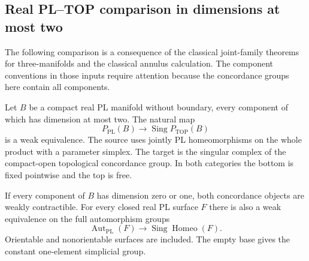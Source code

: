 \subsection{Real PL--TOP comparison in dimensions at most two}

The following comparison is a consequence of the classical joint-family
theorems for three-manifolds and the classical annulus calculation.
The component conventions in those inputs require attention because
the concordance groups here contain all components.

\begin{theorem}\label{thm:low-dimensional-real-concordance-comparison}
Let $B$ be a compact real PL manifold without boundary, every component
of which has dimension at most two.  The natural map
\[
 P_{\mathrm{PL}}(B)\longrightarrow
 \operatorname{Sing}P_{\mathrm{TOP}}(B)
\]
is a weak equivalence.  The source uses jointly PL homeomorphisms on
the whole product with a parameter simplex.  The target is the singular
complex of the compact-open topological concordance group.  In both
categories the bottom is fixed pointwise and the top is free.

If every component of $B$ has dimension zero or one, both concordance
objects are weakly contractible.  For every closed real PL surface $F$
there is also a weak equivalence on the full automorphism groups
\[
 \operatorname{Aut}_{\mathrm{PL}}(F)
 \longrightarrow \operatorname{Sing}\operatorname{Homeo}(F).
\]
Orientable and nonorientable surfaces are included.  The empty base
gives the constant one-element simplicial group.
\end{theorem}


